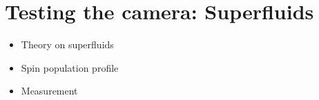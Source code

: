 \chapter{Testing the camera: Superfluids}
\begin{itemize}
	\item Theory on superfluids
	\item Spin population profile
	\item Measurement
\end{itemize}